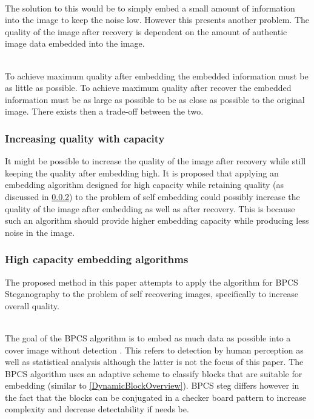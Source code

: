 \documentclass[12pt]{article}
\begin{document}
\hspace{0pt} \\
The solution to this would be to simply embed a small amount of information into the image to keep the noise low.
However this presents another problem.
The quality of the image after recovery is dependent on the amount of authentic image data embedded into the image.

\hspace{0pt} \\
To achieve maximum quality after embedding the embedded information must be as little as possible.
To achieve maximum quality after recover the embedded information must be as large as possible to be as close as possible to the original image.
There exists then a trade-off between the two.

\subsubsection{Increasing quality with capacity}
\label{introQualityIncrease}
It might be possible to increase the quality of the image after recovery while still keeping the quality after embedding high.
It is proposed that applying an embedding algorithm designed for high capacity while retaining quality (as discussed in \ref{introHighCap}) to the problem of self embedding could possibly increase the quality of the image after embedding as well as after recovery.
This is because such an algorithm should provide higher embedding capacity while producing less noise in the image. 

\subsubsection{High capacity embedding algorithms}
\label{introHighCap}
The proposed method in this paper attempts to apply the algorithm for BPCS Steganography \cite{beaullieubpcs} to the problem of self recovering images, specifically to increase overall quality.

\hspace{0pt} \\
The goal of the BPCS algorithm is to embed as much data as possible into a cover image without detection \cite{beaullieubpcs}.
This refers to detection by human perception as well as statistical analysis although the latter is not the focus of this paper.
The BPCS algorithm uses an adaptive scheme to classify blocks that are suitable for embedding (similar to \ref{DynamicBlockOverview}).
BPCS steg differs however in the fact that the blocks can be conjugated in a checker board pattern to increase complexity and decrease detectability if needs be.
\end{document}
